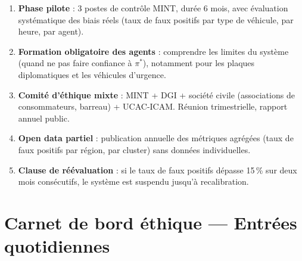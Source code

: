 \begin{enumerate}
  \item \textbf{Phase pilote} : 3 postes de contr\^{o}le MINT, dur\'{e}e 6 mois,
        avec \'{e}valuation syst\'{e}matique des biais r\'{e}els (taux de faux
        positifs par type de v\'{e}hicule, par heure, par agent).
  \item \textbf{Formation obligatoire des agents} : comprendre les limites du
        syst\`{e}me (quand ne pas faire confiance \`{a} $\pi^*$), notamment
        pour les plaques diplomatiques et les v\'{e}hicules d'urgence.
  \item \textbf{Comit\'{e} d'\'{e}thique mixte} : MINT + DGI + soci\'{e}t\'{e}
        civile (associations de consommateurs, barreau) + UCAC-ICAM.
        R\'{e}union trimestrielle, rapport annuel public.
  \item \textbf{Open data partiel} : publication annuelle des m\'{e}triques
        agr\'{e}g\'{e}es (taux de faux positifs par r\'{e}gion, par cluster)
        sans donn\'{e}es individuelles.
  \item \textbf{Clause de r\'{e}\'{e}valuation} : si le taux de faux positifs
        d\'{e}passe 15\,\% sur deux mois cons\'{e}cutifs, le syst\`{e}me est
        suspendu jusqu'\`{a} recalibration.
\end{enumerate}

\section*{Carnet de bord \'{e}thique --- Entr\'{e}es quotidiennes}
\label{sec:d:carnet}

